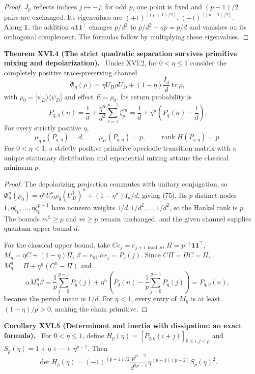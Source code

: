 \documentclass[11pt,a4paper,oneside]{book}
\newcommand{\one}{\mathbf 1}\newcommand{\ii}{\mathrm i}\newcommand{\dd}{\mathrm d}
\DeclareMathOperator{\rank}{rank}\DeclareMathOperator{\Tr}{Tr}
\newcommand{\statement}[3]{\par\medskip\noindent\textbf{#1 #2 (#3).}\ }
\begin{document}
\begin{proof}$J_p$ reflects indices $j\mapsto-j$; for odd $p$, one point is fixed and $(p-1)/2$ pairs are exchanged. Its eigenvalues are $(+1)^{[(p+1)/2]}$, $(-1)^{[(p-1)/2]}$. Along $\one$, the addition $a\one\one^\top$ changes $p/d^2$ to $p/d^2+ap=p/d$ and vanishes on its orthogonal complement. The formulas follow by multiplying these eigenvalues.\end{proof}
\statement{Theorem}{XVI.4}{The strict quadratic separation survives primitive mixing and depolarization} Under XVI.2, for $0<\eta\le1$ consider the completely positive trace-preserving channel
\[\Phi_\eta(\rho)=\eta U_D\rho U_D^\dagger+(1-\eta)\frac{I_d}d\operatorname{tr}\rho,\]
with $\rho_0=|\psi_D\rangle\langle\psi_D|$ and effect $E=\rho_0$. Its return probability is
\begin{equation}P_{q,\eta}(n)=\frac1d+\frac{\eta^n}{d^2}\sum_{r=1}^{p-1}\zeta_p^{rn}=\frac1d+\eta^n\left(P_q(n)-\frac1d\right).\tag{75}\end{equation}
For every strictly positive $\eta$,
\[\mu_{\mathrm{qm}}(P_{q,\eta})=d,\qquad\mu_{\mathrm{cl}}(P_{q,\eta})=p,\qquad\rank H(P_{q,\eta})=p.\]
For $0<\eta<1$, a strictly positive primitive aperiodic transition matrix with a unique stationary distribution and exponential mixing attains the classical minimum $p$.
\begin{proof}The depolarizing projection commutes with unitary conjugation, so $\Phi_\eta^n(\rho_0)=\eta^nU_D^n\rho_0(U_D^\dagger)^n+(1-\eta^n)I_d/d$, giving (75). Its $p$ distinct nodes $1,\eta\zeta_p,\ldots,\eta\zeta_p^{p-1}$ have nonzero weights $1/d,1/d^2,\ldots,1/d^2$, so the Hankel rank is $p$. The bounds $m^2\ge p$ and $m\ge p$ remain unchanged, and the given channel supplies quantum upper bound $d$.

For the classical upper bound, take $Ce_j=e_{j+1\bmod p}$, $\Pi=p^{-1}\one\one^\top$, $M_\eta=\eta C+(1-\eta)\Pi$, $\beta=e_0$, $\alpha e_j=P_q(j)$. Since $C\Pi=\Pi C=\Pi$, $M_\eta^n=\Pi+\eta^n(C^n-\Pi)$ and
\[\alpha M_\eta^n\beta=\frac1p\sum_{j=0}^{p-1}P_q(j)+\eta^n\left(P_q(n)-\frac1p\sum_{j=0}^{p-1}P_q(j)\right)=P_{q,\eta}(n),\]
because the period mean is $1/d$. For $\eta<1$, every entry of $M_\eta$ is at least $(1-\eta)/p>0$, making the chain primitive.\end{proof}
\statement{Corollary}{XVI.5}{Determinant and inertia with dissipation: an exact formula} For $0<\eta\le1$, define $H_p(\eta)=[P_{q,\eta}(i+j)]_{0\le i,j<p}$ and $S_p(\eta)=1+\eta+\cdots+\eta^{p-1}$. Then
\begin{equation}\det H_p(\eta)=(-1)^{(p-1)/2}\frac{p^{p-2}}{d^{2p-1}}\eta^{(p-1)(p-2)}S_p(\eta)^2.\tag{76}\end{equation}
\end{document}
